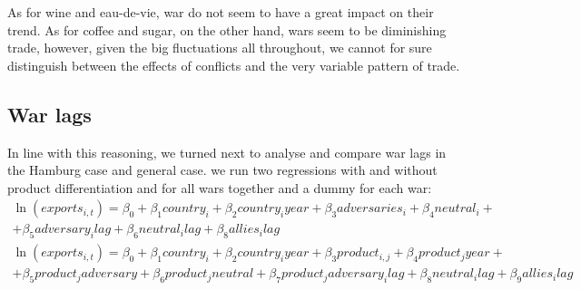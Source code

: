 \documentclass[12pt,a4paper,notitlepage,english]{article}
\begin{document}
\fi
As for wine and eau-de-vie, war do not seem to have a great impact on their trend.
As for coffee and sugar, on the other hand, wars seem to be diminishing trade, however, given the big fluctuations all throughout, we cannot for sure distinguish between the effects of conflicts and the very variable pattern of trade.

\iffalse
\subsection{War lags}
In line with this reasoning, we turned next to analyse and compare war lags in the Hamburg case and general case.
we run two regressions with and without product differentiation and for all wars together and a dummy for each war: 
\begin{multline}
\ln(exports_{i,t})=\beta_0+\beta_1country_i+\beta_2country_iyear+\beta_3adversaries_i+\beta_4neutral_i+\\+\beta_5adversary_ilag+\beta_6neutral_ilag+\beta_8allies_ilag
\end{multline}
\begin{multline}
\ln(exports_{i,t})=\beta_0+\beta_1country_i+\beta_2country_iyear+\beta_3product_{i,j}+\beta_4product_jyear+\\+\beta_5product_jadversary+ \beta_6product_jneutral+\beta_7product_jadversary_ilag+\beta_8neutral_ilag+\beta_9allies_ilag
\end{multline}
\end{document}
